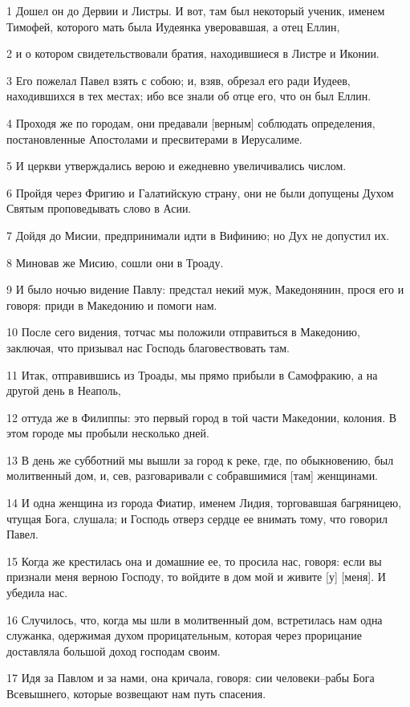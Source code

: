 \par 1 Дошел он до Дервии и Листры. И вот, там был некоторый ученик, именем Тимофей, которого мать была Иудеянка уверовавшая, а отец Еллин,
\par 2 и о котором свидетельствовали братия, находившиеся в Листре и Иконии.
\par 3 Его пожелал Павел взять с собою; и, взяв, обрезал его ради Иудеев, находившихся в тех местах; ибо все знали об отце его, что он был Еллин.
\par 4 Проходя же по городам, они предавали [верным] соблюдать определения, постановленные Апостолами и пресвитерами в Иерусалиме.
\par 5 И церкви утверждались верою и ежедневно увеличивались числом.
\par 6 Пройдя через Фригию и Галатийскую страну, они не были допущены Духом Святым проповедывать слово в Асии.
\par 7 Дойдя до Мисии, предпринимали идти в Вифинию; но Дух не допустил их.
\par 8 Миновав же Мисию, сошли они в Троаду.
\par 9 И было ночью видение Павлу: предстал некий муж, Македонянин, прося его и говоря: приди в Македонию и помоги нам.
\par 10 После сего видения, тотчас мы положили отправиться в Македонию, заключая, что призывал нас Господь благовествовать там.
\par 11 Итак, отправившись из Троады, мы прямо прибыли в Самофракию, а на другой день в Неаполь,
\par 12 оттуда же в Филиппы: это первый город в той части Македонии, колония. В этом городе мы пробыли несколько дней.
\par 13 В день же субботний мы вышли за город к реке, где, по обыкновению, был молитвенный дом, и, сев, разговаривали с собравшимися [там] женщинами.
\par 14 И одна женщина из города Фиатир, именем Лидия, торговавшая багряницею, чтущая Бога, слушала; и Господь отверз сердце ее внимать тому, что говорил Павел.
\par 15 Когда же крестилась она и домашние ее, то просила нас, говоря: если вы признали меня верною Господу, то войдите в дом мой и живите [у] [меня]. И убедила нас.
\par 16 Случилось, что, когда мы шли в молитвенный дом, встретилась нам одна служанка, одержимая духом прорицательным, которая через прорицание доставляла большой доход господам своим.
\par 17 Идя за Павлом и за нами, она кричала, говоря: сии человеки--рабы Бога Всевышнего, которые возвещают нам путь спасения.
